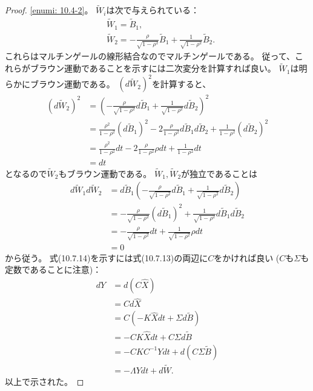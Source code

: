 \documentclass[uplatex]{jsarticle}
\theoremstyle{definition}
\begin{document}
\begin{proof}
  \ref{enumi: 10.4-2}。
  \(\tilde{W}_i\)は次で与えられている：
  \begin{align*}
    &\tilde{W}_1 = \tilde{B}_1, \\
    &\tilde{W}_2
    = - \frac{\rho}{\sqrt{1-\rho^2}}\tilde{B}_1
    + \frac{1}{\sqrt{1-\rho^2}}\tilde{B}_2.
  \end{align*}
  これらはマルチンゲールの線形結合なのでマルチンゲールである。
  従って、これらがブラウン運動であることを示すには二次変分を計算すれば良い。
  \(\tilde{W}_1\)は明らかにブラウン運動である。
  \((d\tilde{W}_2)^2\)を計算すると、
  \begin{align*}
    \left(d\tilde{W}_2\right)^2
    &= \left( - \frac{\rho}{\sqrt{1-\rho^2}}d\tilde{B}_1
    + \frac{1}{\sqrt{1-\rho^2}}d\tilde{B}_2\right)^2 \\
    &= \frac{\rho^2}{1-\rho^2}\left(d\tilde{B}_1\right)^2
    - 2\frac{\rho}{1-\rho^2}d\tilde{B}_1d\tilde{B}_2
    + \frac{1}{1-\rho^2}\left(d\tilde{B}_2\right)^2 \\
    &= \frac{\rho^2}{1-\rho^2}dt
    - 2\frac{\rho}{1-\rho^2}\rho dt
    + \frac{1}{1-\rho^2}dt \\
    &= dt
  \end{align*}
  となるので\(\tilde{W}_2\)もブラウン運動である。
  \(\tilde{W}_1,\tilde{W}_2\)が独立であることは
  \begin{align*}
    d\tilde{W}_1d\tilde{W}_2
    &= d\tilde{B}_1 \left(
    - \frac{\rho}{\sqrt{1-\rho^2}}d\tilde{B}_1
    + \frac{1}{\sqrt{1-\rho^2}}d\tilde{B}_2\right) \\
    &= - \frac{\rho}{\sqrt{1-\rho^2}}\left( d\tilde{B}_1 \right)^2
    + \frac{1}{\sqrt{1-\rho^2}}d\tilde{B}_1d\tilde{B}_2 \\
    &= - \frac{\rho}{\sqrt{1-\rho^2}}dt
    + \frac{1}{\sqrt{1-\rho^2}}\rho dt \\
    &= 0
  \end{align*}
  から従う。
  式(10.7.14)を示すには式(10.7.13)の両辺に\(C\)をかければ良い
  (\(C\)も\(\Sigma\)も定数であることに注意)：
  \begin{align*}
    dY
    &= d\left(C\hat{X}\right) \\
    &= Cd\hat{X} \\
    &= C\left( - K\hat{X}dt + \Sigma d\tilde{B} \right) \\
    &= - CK\hat{X}dt + C\Sigma d\tilde{B} \\
    &= - CKC^{-1}Ydt + d\left( C\Sigma \tilde{B}\right) \\
    &= - \Lambda Ydt + d\tilde{W}.
  \end{align*}
  以上で示された。


\end{proof}
\end{document}
